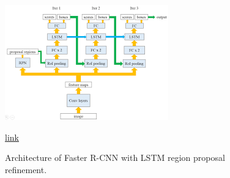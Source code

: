 \begin{figure}
	\centering
	\includegraphics[width=\linewidth]{img19}
	\caption{Architecture of Faster R-CNN with LSTM region proposal refinement.} \href{http://cs231n.stanford.edu/reports/2017/pdfs/112.pdf}{link}
	\label{fig:img19}
	\end{figure}

